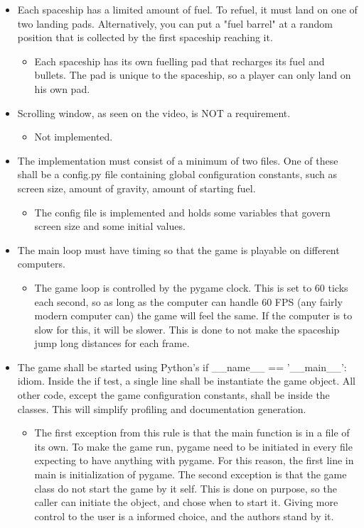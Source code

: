 \documentclass{article}
\begin{document}
\begin{itemize}
\begin{itemize}
	\end{itemize}
	\item  Each spaceship has a limited amount of fuel. To refuel, it must land on one of two landing pads. Alternatively, you can put a "fuel barrel" at a random position that is collected by the first spaceship reaching it.
	\begin{itemize}
		\item Each spaceship has its own fuelling pad that recharges its fuel and bullets. The pad is unique to the spaceship, so a player can only land on his own pad.
	\end{itemize}
	\item Scrolling window, as seen on the video, is NOT a requirement.
	\begin{itemize}
		\item Not implemented.
	\end{itemize}
	\item The implementation must consist of a minimum of two files. One of these shall be a config.py file containing global configuration constants, such as screen size, amount of gravity, amount of starting fuel.
	\begin{itemize}
		\item The config file is implemented and holds some variables that govern screen size and some initial values.
	\end{itemize}
	\item The main loop must have timing so that the game is playable on different computers.
	\begin{itemize}
		\item The game loop is controlled by the pygame clock. This is set to 60 ticks each second, so as long as the computer can handle 60 FPS (any fairly modern computer can) the game will feel the same. If the computer is to slow for this, it will be slower. This is done to not make the spaceship jump long distances for each frame.
	\end{itemize}
	\item The game shall be started using Python's if \_\_name\_\_ == '\_\_main\_\_': idiom. Inside the if test, a single line shall be instantiate the game object. All other code, except the game configuration constants, shall be inside the classes. This will simplify profiling and documentation generation.
	\begin{itemize}
		\item The first exception from this rule is that the main function is in a file of its own. To make the game run, pygame need to be initiated in every file expecting to have anything with pygame. For this reason, the first line in main is initialization of pygame. The second exception is that the game class do not start the game by it self. This is done on purpose, so the caller can initiate the object, and chose when to start it. Giving more control to the user is a informed choice, and the authors stand by it.

\end{itemize}
\end{itemize}
\end{document}
